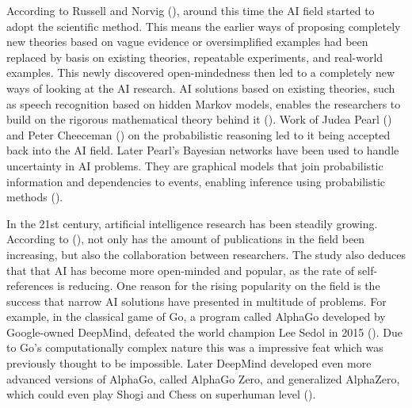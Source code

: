 According to Russell and Norvig (\cite*{norvig2002}), around this time the AI
field started to adopt the scientific method. This means the earlier ways of
proposing completely new theories based on vague evidence or oversimplified
examples had been replaced by basis on existing theories, repeatable
experiments, and real-world examples. This newly discovered open-mindedness then
led to a completely new ways of looking at the AI research. AI solutions based
on existing theories, such as speech recognition based on hidden Markov models,
enables the researchers to build on the rigorous mathematical theory behind it
(\cite{norvig2002}). Work of Judea Pearl (\cite*{pearl1988}) and Peter Cheeceman
(\cite*{cheeseman1985}) on the probabilistic reasoning led to it being accepted
back into the AI field. Later Pearl's Bayesian networks have been used to handle
uncertainty in AI problems. They are graphical models that join probabilistic
information and dependencies to events, enabling inference using probabilistic
methods (\cite{goertzel2007}).



In the 21st century, artificial intelligence research has been steadily growing.
According to (\cite{liu2018}), not only has the amount of publications in the
field been increasing, but also the collaboration between researchers. The study
also deduces that that AI has become more open-minded and popular, as the rate
of self-references is reducing. One reason for the rising popularity on the
field is the success that narrow AI solutions have presented in multitude of
problems. For example, in the classical game of Go, a program called AlphaGo
developed by Google-owned DeepMind, defeated the world champion Lee Sedol in
2015 (\cite{silver2016}). Due to Go's computationally complex nature this was a
impressive feat which was previously thought to be impossible. Later DeepMind
developed even more advanced versions of AlphaGo, called AlphaGo Zero, and
generalized AlphaZero, which could even play Shogi and Chess on superhuman level
(\cite{silver2018}).


